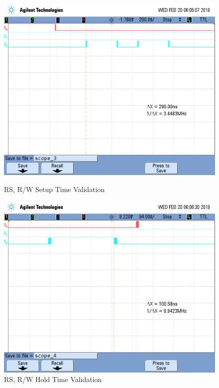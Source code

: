 \documentclass[a4paper, 12pt]{article}
\begin{document}
\begin{figure}[htb]
\centering
\includegraphics[width=.8\textwidth]{2.png}
\caption{RS, R/W Setup Time Validation}
\includegraphics[width=.8\textwidth]{3.png}
\caption{RS, R/W Hold Time Validation}
\end{figure}
\end{document}
